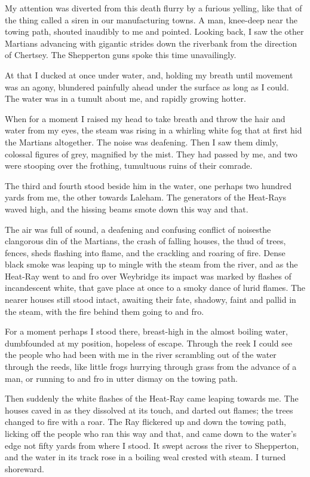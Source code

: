 My attention was diverted from this death flurry by a furious
yelling, like that of the thing called a siren in our manufacturing
towns. A man, knee-deep near the towing path, shouted inaudibly to
me and pointed. Looking back, I saw the other Martians advancing
with gigantic strides down the riverbank from the direction of
Chertsey. The Shepperton guns spoke this time unavailingly.

At that I ducked at once under water, and, holding my breath until
movement was an agony, blundered painfully ahead under the surface
as long as I could. The water was in a tumult about me, and rapidly
growing hotter.

When for a moment I raised my head to take breath and throw the
hair and water from my eyes, the steam was rising in a whirling
white fog that at first hid the Martians altogether. The noise was
deafening. Then I saw them dimly, colossal figures of grey,
magnified by the mist. They had passed by me, and two were stooping
over the frothing, tumultuous ruins of their comrade.

The third and fourth stood beside him in the water, one perhaps two
hundred yards from me, the other towards Laleham. The generators of
the Heat-Rays waved high, and the hissing beams smote down this way
and that.

The air was full of sound, a deafening and confusing conflict of
noises\dash{}the clangorous din of the Martians, the crash of falling
houses, the thud of trees, fences, sheds flashing into flame, and
the crackling and roaring of fire. Dense black smoke was leaping up
to mingle with the steam from the river, and as the Heat-Ray went
to and fro over Weybridge its impact was marked by flashes of
incandescent white, that gave place at once to a smoky dance of
lurid flames. The nearer houses still stood intact, awaiting their
fate, shadowy, faint and pallid in the steam, with the fire behind
them going to and fro.

For a moment perhaps I stood there, breast-high in the almost
boiling water, dumbfounded at my position, hopeless of escape.
Through the reek I could see the people who had been with me in the
river scrambling out of the water through the reeds, like little
frogs hurrying through grass from the advance of a man, or running
to and fro in utter dismay on the towing path.

Then suddenly the white flashes of the Heat-Ray came leaping
towards me. The houses caved in as they dissolved at its touch, and
darted out flames; the trees changed to fire with a roar. The Ray
flickered up and down the towing path, licking off the people who
ran this way and that, and came down to the water's edge not fifty
yards from where I stood. It swept across the river to Shepperton,
and the water in its track rose in a boiling weal crested with
steam. I turned shoreward.

